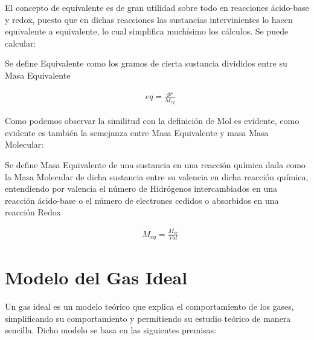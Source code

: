 El concepto de equivalente es de gran utilidad sobre todo en reacciones ácido-base y redox, puesto que en dichas reacciones las sustancias intervinientes lo hacen equivalente a equivalente, lo cual simplifica muchísimo los cálculos. Se puede calcular:\\

\begin{definition}[Equivalente]
	
	Se define Equivalente como los gramos de cierta sustancia divididos entre su Masa Equivalente
	
	\begin{align}
		& eq =\frac{gr}{M_{eq}}
	\end{align}
	
\end{definition}

Como podemos observar la similitud con la definición de Mol es evidente, como evidente es también la semejanza entre Masa Equivalente y masa Masa Molecular:\\

\begin{definition}

Se define Masa Equivalente de una sustancia en una reacción química dada como la Masa Molecular de dicha sustancia entre su valencia en dicha reacción química, entendiendo por valencia el número de Hidrógenos intercambiados en una reacción ácido-base o el número de electrones cedidos o absorbidos en una reacción Redox

\begin{align}
	& M_{eq} = \frac{M_{m}}{Val}
\end{align}

\end{definition}

\section{Modelo del Gas Ideal}

Un gas ideal es un modelo teórico que explica el comportamiento de los gases, simplificando su comportamiento y permitiendo su estudio teórico de manera sencilla. Dicho modelo se basa en las siguientes premisas:
\\

